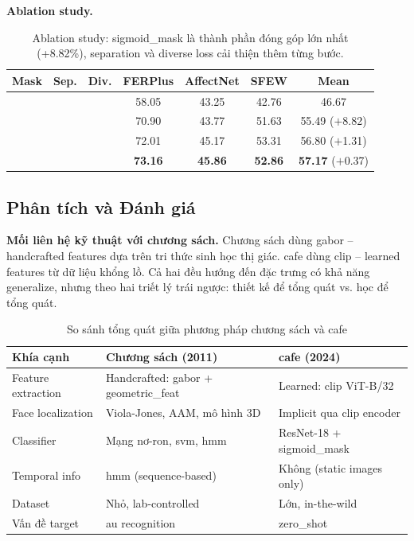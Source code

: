 \documentclass[12pt,a4paper]{article}
\newcommand{\cmark}{\ding{51}}
\let\oldtextbf\textbf
\renewcommand{\textbf}[1]{\oldtextbf{\textcolor{hcmublue}{#1}}}
\begin{document}
\textbf{Ablation study.}

\begin{table}[H]
\centering
\begin{tabular}{|c|c|c|c|c|c|c|}
\hline
\textbf{Mask} & \textbf{Sep.} & \textbf{Div.} & \textbf{FERPlus} & \textbf{AffectNet} & \textbf{SFEW} & \textbf{Mean} \\ \hline
  &   &   & 58.05 & 43.25 & 42.76 & 46.67 \\
\cmark &   &   & 70.90 & 43.77 & 51.63 & 55.49 \quad ($+$8.82) \\
\cmark & \cmark &   & 72.01 & 45.17 & 53.31 & 56.80 \quad ($+$1.31) \\
\cmark & \cmark & \cmark & \textbf{73.16} & \textbf{45.86} & \textbf{52.86} & \textbf{57.17} \quad ($+$0.37) \\ \hline
\end{tabular}
\caption{Ablation study: \gls{sigmoid_mask} là thành phần đóng góp lớn nhất (+8.82\%), separation và diverse loss cải thiện thêm từng bước.}
\label{tab:ablation}
\end{table}

\subsection{Phân tích và Đánh giá}

\textbf{Mối liên hệ kỹ thuật với chương sách.}
Chương sách dùng \gls{gabor} -- handcrafted features dựa trên tri thức sinh học thị giác. \gls{cafe} dùng \gls{clip} -- learned features từ dữ liệu khổng lồ. Cả hai đều hướng đến đặc trưng có khả năng generalize, nhưng theo hai triết lý trái ngược: thiết kế để tổng quát vs. học để tổng quát.

\begin{table}[H]
\centering
\small
\begin{tabular}{|l|p{5cm}|p{5cm}|}
\hline
\textbf{Khía cạnh} & \textbf{Chương sách (2011)} & \textbf{\gls{cafe} (2024)} \\ \hline
Feature extraction & Handcrafted: \gls{gabor} + \gls{geometric_feat} & Learned: \gls{clip} ViT-B/32 \\ \hline
Face localization & Viola-Jones, AAM, mô hình 3D & Implicit qua \gls{clip} encoder \\ \hline
Classifier & Mạng nơ-ron, \gls{svm}, \gls{hmm} & ResNet-18 + \gls{sigmoid_mask} \\ \hline
Temporal info & \gls{hmm} (sequence-based) & Không (static images only) \\ \hline
Dataset & Nhỏ, lab-controlled & Lớn, in-the-wild \\ \hline
Vấn đề target & \gls{au} recognition & \gls{zero_shot} \\ \hline
\end{tabular}
\caption{So sánh tổng quát giữa phương pháp chương sách và \gls{cafe}}
\label{tab:comparison}
\end{table}
\end{document}
